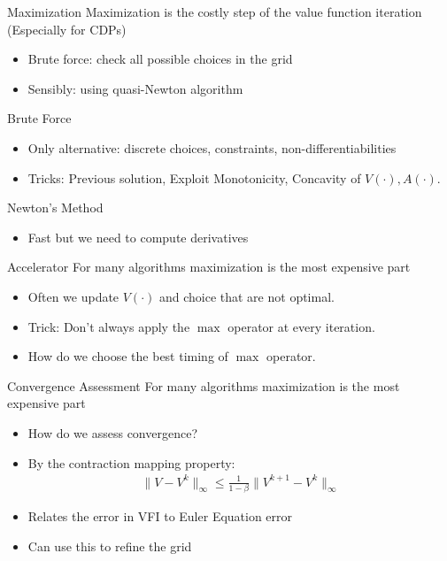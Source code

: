\documentclass[xcolor=pdftex,dvipsnames,table,mathserif]{beamer}
\begin{document}
\begin{frame}{Maximization}
Maximization is the costly step of the value function iteration (Especially for CDPs)
\begin{itemize}
\item Brute force: check all possible choices in the grid
\item Sensibly: using quasi-Newton algorithm
\end{itemize}
Brute Force
\begin{itemize}
\item Only alternative: discrete choices, constraints, non-differentiabilities
\item Tricks: Previous solution, Exploit Monotonicity, Concavity of $V(\cdot), A(\cdot)$.
\end{itemize}
Newton's Method
\begin{itemize}
\item Fast but we need to compute derivatives
\end{itemize}
\end{frame}

\begin{frame}{Accelerator}
For many algorithms maximization is the most expensive part
\begin{itemize}
\item Often we update $V(\cdot)$ and choice that are not optimal.
\item Trick: Don't always apply the $\max$ operator at every iteration.
\item How do we choose the best timing of $\max$ operator.
\end{itemize}
\end{frame}


\begin{frame}{Convergence Assessment}
For many algorithms maximization is the most expensive part
\begin{itemize}
\item How do we assess convergence?
\item By the contraction mapping property: 
\begin{eqnarray*}
\|V-V^k\|_{\infty} \leq \frac{1}{1-\beta} \|V^{k+1} - V^{k} \|_{\infty}
\end{eqnarray*}
\item Relates the error in VFI to Euler Equation error
\item Can use this to refine the grid
\end{itemize}
\end{frame}
\end{document}
